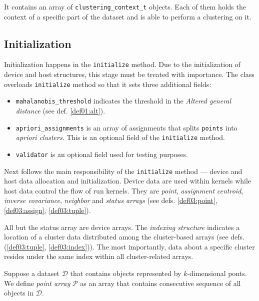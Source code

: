 It contains an array of \texttt{clustering\_context\_t} objects. Each of them holds the context of a specific part of the dataset and is able to perform a clustering on it.

\subsection{Initialization}

Initialization happens in the \texttt{initialize} method. Due to the initialization of device and host structures, this stage must be treated with importance.
The class overloads \texttt{initialize} method so that it sets three additional fields:
\begin{itemize}
	\item \texttt{mahalanobis\_threshold} indicates the threshold in the \emph{Altered general distance} (see def. \ref{def01:alt}).
	
	\item\texttt{apriori\_assignments}  is an array of assignments that splits \texttt{points} into \emph{apriori clusters}. This is an optional field of the \texttt{initialize} method.
	
	\item \texttt{validator} is an optional field used for testing purposes.
\end{itemize}

Next follows the main responsibility of the \texttt{initialize} method --- device and host data allocation and initialization. Device data are used within kernels while host data control the flow of run kernels. They are \emph{point}, \emph{assignment} \emph{centroid}, \emph{inverse covariance}, \emph{neighbor} and \emph{status arrays} (see defs. \ref{def03:point}, \ref{def03:assign}, \ref{def03:tuple}). 

All but the status array are device arrays. The \emph{indexing structure} indicates a location of a cluster data distributed among the cluster-based arrays (see defs. (\ref{def03:tuple}, \ref{def03:index})). The most importantly, data about a specific cluster resides under the same index within all cluster-related arrays.

\begin{defn}
	Suppose a dataset $\mathcal{D}$ that contains objects represented by $k$-di\-men\-si\-onal ponts. We define \emph{point array} $\mathcal{P}$ as an array that contains consecutive sequence of all objects in $\mathcal{D}$.
	\label{def03:point}
\end{defn}

